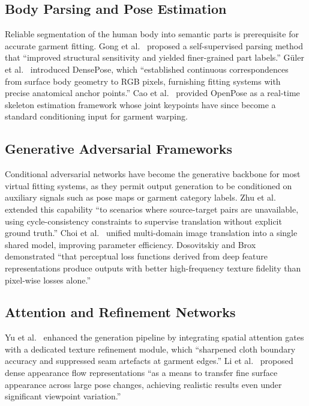 \documentclass[conference]{IEEEtran}
\begin{document}
\subsection{Body Parsing and Pose Estimation}

Reliable segmentation of the human body into semantic parts is prerequisite for accurate garment fitting. Gong et al.~\cite{b10} proposed a self-supervised parsing method that ``improved structural sensitivity and yielded finer-grained part labels.'' G\"{u}ler et al.~\cite{b16} introduced DensePose, which ``established continuous correspondences from surface body geometry to RGB pixels, furnishing fitting systems with precise anatomical anchor points.'' Cao et al.~\cite{b13} provided OpenPose as a real-time skeleton estimation framework whose joint keypoints have since become a standard conditioning input for garment warping.

\subsection{Generative Adversarial Frameworks}

Conditional adversarial networks \cite{b6,b21} have become the generative backbone for most virtual fitting systems, as they permit output generation to be conditioned on auxiliary signals such as pose maps or garment category labels. Zhu et al.~\cite{b8} extended this capability ``to scenarios where source-target pairs are unavailable, using cycle-consistency constraints to supervise translation without explicit ground truth.'' Choi et al.~\cite{b17} unified multi-domain image translation into a single shared model, improving parameter efficiency. Dosovitskiy and Brox~\cite{b22} demonstrated ``that perceptual loss functions derived from deep feature representations produce outputs with better high-frequency texture fidelity than pixel-wise losses alone.''

\subsection{Attention and Refinement Networks}

Yu et al.~\cite{b25} enhanced the generation pipeline by integrating spatial attention gates with a dedicated texture refinement module, which ``sharpened cloth boundary accuracy and suppressed seam artefacts at garment edges.'' Li et al.~\cite{b20} proposed dense appearance flow representations ``as a means to transfer fine surface appearance across large pose changes, achieving realistic results even under significant viewpoint variation.''
\end{document}
